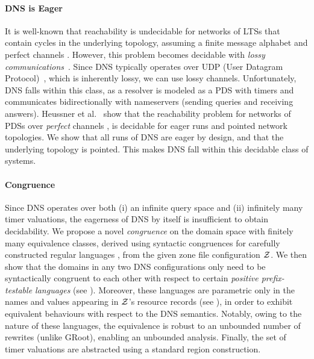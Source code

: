 \paragraph{DNS is Eager}
It is well-known that reachability is undecidable for networks of LTSs that contain cycles in the underlying topology, assuming a finite message alphabet and perfect channels \cite{brand1983communicating}.
However, this problem becomes  decidable with \emph{lossy communications}~\cite{finkel2001well, AbJo:lossy:IC}. 
Since DNS typically operates over UDP (User Datagram Protocol)~\cite{rfc1035}, which is inherently lossy, we can use lossy channels.
 Unfortunately, DNS falls within this class, as a resolver is modeled as a PDS with timers and communicates bidirectionally with nameservers (sending queries and receiving answers). 
 Heussner et al.~\cite{heussner2010reachability, heussner2012reachability} show that the reachability problem for networks of PDSs over \emph{perfect} channels , is decidable for eager runs and pointed network topologies. We show that all runs of DNS are eager by design, and that the underlying topology is pointed. This makes DNS fall within this decidable class of systems.


\paragraph{Congruence}
 Since DNS operates over both (i) an infinite query space and (ii) infinitely many timer valuations,
 the eagerness of DNS by itself is insufficient to obtain decidability.  We propose a novel \emph{congruence} on the domain space with finitely many equivalence classes, derived using syntactic congruences for carefully constructed regular languages \cite{nerode1958synmon,rabinscott1959synmon}, from the given zone file configuration $\cal Z$. We then show that the domains in any two DNS configurations only need to be syntactically congruent to each other with respect to certain \emph{positive prefix-testable languages} (see ). Moreover, these languages are parametric only in the names and values appearing in $\cal Z$'s resource records (see ), in order to exhibit equivalent behaviours with respect to the DNS semantics. Notably,
 owing to the nature of these languages, the equivalence is robust to an unbounded number of  rewrites (unlike GRoot), enabling an unbounded analysis.  Finally, the set of timer valuations are abstracted using a standard region construction.

